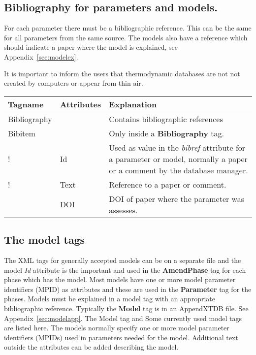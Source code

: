 \documentclass{article}
\begin{document}
\subsection{Bibliography for parameters and models.}\label{sec:biblio}

For each parameter there must be a bibliographic reference.  This can
be the same for all parameters from the same source.  The models also
have a reference which should indicate a paper where the model is
explained, see Appendix~\ref{sec:modelex}.

It is important to inform the users that thermodynamic databases are
not not created by computers or appear from thin air.

\bigskip
\begin{tabular}{|p{} p{} p{}|}\hline
  Tagname& Attributes &  Explanation\\\hline

  Bibliography & & Contains bibliographic references\\\hline

  Bibitem & & Only inside a {\bf Bibliography} tag.\\
!      & Id &   Used as value in the {\em bibref} attribute for a parameter
            or model, normally a paper or a comment by the database manager.\\
!      & Text & Reference to a paper or comment.\\
       & DOI & DOI of paper where the parameter was assesses.\\\hline
\end{tabular}

\subsection{The model tags}\label{sec:models}

The XML tags for generally accepted models can be on a separate file
and the model {\em Id} attribute is the important and used in the {\bf
  AmendPhase} tag for each phase which has the model.  Most models
have one or more model parameter identifiers (MPID) as attributes and
these are used in the {\bf Parameter} tag for the phases.  Models must
be explained in a model tag with an appropriate bibliographic
reference.  Typically the {\bf Model} tag is in an AppendXTDB file.
See Appendix~\ref{sec:modelapp}.  The Model tag and Some currently
used model tags are listed here.  The models normally specify one or
more model parameter identifiers (MPIDs) used in parameters needed for
the model.  Additional text outside the attributes can be added
describing the model.
\end{document}

